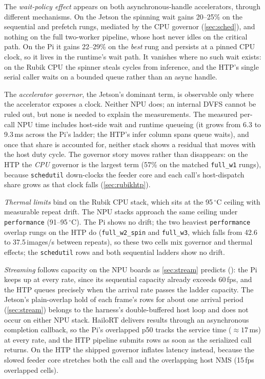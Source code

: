 The \emph{wait-policy effect} appears on both asynchronous-handle
accelerators, through different mechanisms. On the Jetson the spinning
wait gains 20--25\% on the sequential and prefetch rungs, mediated by
the CPU governor (\cref{sec:sched}), and nothing on the full
two-worker pipeline, whose host never idles on the critical path. On
the Pi it gains 22--29\% on the \emph{best} rung and persists at a
pinned CPU clock, so it lives in the runtime's wait path. It vanishes
where no such wait exists: on the Rubik CPU the spinner steals cycles
from inference, and the HTP's single serial caller waits on a bounded
queue rather than an async handle.

The \emph{accelerator governor}, the Jetson's dominant term, is
observable only where the accelerator exposes a clock. Neither NPU
does; an internal DVFS cannot be ruled out, but none is needed to
explain the measurements. The measured per-call NPU time includes
host-side wait and runtime queueing (it grows from 6.3 to 9.3\,ms
across the Pi's ladder; the HTP's infer column spans queue waits), and
once that share is accounted for, neither stack shows a residual that
moves with the host duty cycle. The governor story moves rather than
disappears: on the HTP the \emph{CPU} governor is the largest term
(57\% on the matched \texttt{full\_w1} rungs), because
\texttt{schedutil} down-clocks the feeder core and each call's
host-dispatch share grows as that clock falls (\cref{sec:rubikhtp}).

\emph{Thermal limits} bind on the Rubik CPU stack, which sits at the
95\,$^\circ$C ceiling with measurable repeat drift. The NPU stacks
approach the same ceiling under \texttt{performance}
(91--95\,$^\circ$C). The Pi shows no drift; the two heaviest
\texttt{performance} overlap rungs on the HTP do (\texttt{full\_w2\_spin}
and \texttt{full\_w3}, which falls from 42.6 to 37.5\,images/s between
repeats), so these two cells mix governor and thermal effects; the
\texttt{schedutil} rows and both sequential ladders show no drift.

\emph{Streaming} follows capacity on the NPU boards as
\cref{sec:stream} predicts (): the Pi
keeps up at every rate, since its sequential capacity already exceeds
60\,fps, and the HTP queues precisely when the arrival rate passes the
ladder capacity. The Jetson's plain-overlap hold of each frame's rows
for about one arrival period (\cref{sec:stream}) belongs to the
harness's double-buffered host loop and does not occur on either NPU
stack. HailoRT delivers results through an asynchronous completion
callback, so the Pi's overlapped p50 tracks the service time
(${\approx}17$\,ms) at every rate, and the HTP pipeline submits rows
as soon as the serialized call returns. On the HTP the shipped
governor inflates latency instead, because the slowed feeder core
stretches both the call and the overlapping host NMS (15\,fps
overlapped cells).

